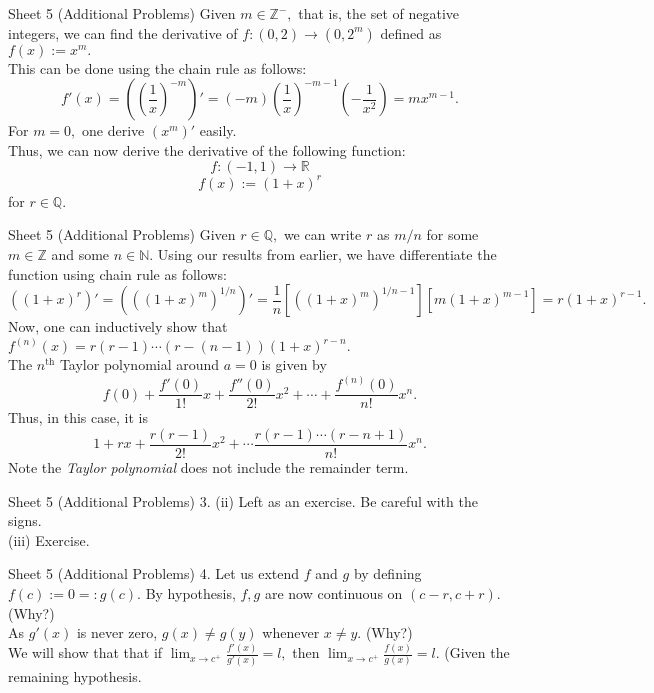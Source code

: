 \documentclass[handout, aspectratio=169]{beamer}
\begin{document}
\begin{frame}{Sheet 5 (Additional Problems)}
	Given $m \in \mathbb{Z}^-,$ that is, the set of negative integers, we can find the derivative of $f:(0, 2) \to (0, 2^m)$ defined as $f(x) := x^m.$\\
	This can be done using the chain rule as follows:
	\[f'(x) = \left(\left(\frac{1}{x}\right)^{-m}\right)' = (-m)\left(\frac{1}{x}\right)^{-m-1}\left(-\dfrac{1}{x^2}\right) = mx^{m-1}.\]
	For $m = 0,$ one derive $(x^m)'$ easily.\\
	Thus, we can now derive the derivative of the following function:
	\[f:(-1, 1) \to \mathbb{R}\] \[f(x) := (1 + x)^r\]
	for $r \in \mathbb{Q}.$
\end{frame}
\begin{frame}{Sheet 5 (Additional Problems)}
	Given $r \in \mathbb{Q},$ we can write $r$ as $m/n$ for some $m \in \mathbb{Z}$ and some $n \in \mathbb{N}.$ Using our results from earlier, we have differentiate the function using chain rule as follows:
	\[\left((1 + x)^r\right)' = \left(\left((1+x)^m\right)^{1/n}\right)' = \frac{1}{n}\left[((1+x)^m)^{1/n - 1}\right]\left[m(1 + x)^{m-1}\right] = r(1 + x)^{r-1}.\]
	Now, one can inductively show that $f^{(n)}(x) =r (r-1)\cdots (r - (n-1))(1 + x)^{r-n}.$\\
	The $n^{\text{th}}$ Taylor polynomial around $a = 0$ is given by
	\[f(0) + \dfrac{f'(0)}{1!}x + \dfrac{f''(0)}{2!}x^2 + \cdots + \dfrac{f^{(n)}(0)}{n!}x^n.\]
	Thus, in this case, it is
	\[1 + rx + \dfrac{r(r-1)}{2!}x^2 + \cdots \dfrac{r(r-1)\cdots(r-n+1)}{n!}x^n.\]
	Note the \emph{Taylor polynomial} does not include the remainder term.
\end{frame}
\begin{frame}{Sheet 5 (Additional Problems)}
	3. (ii) Left as an exercise. Be careful with the signs.\\
	(iii) Exercise.
\end{frame}
\begin{frame}{Sheet 5 (Additional Problems)}
	4. Let us extend $f$ and $g$ by defining $f(c) := 0 =: g(c).$ By hypothesis, $f, g$ are now continuous on $(c-r, c+r).$ (Why?)\\
	As $g'(x)$ is never zero, $g(x) \neq g(y)$ whenever $x \neq y.$ (Why?)\\
	We will show that that if $\displaystyle\lim_{x\to c^+}\frac{f'(x)}{g'(x)} = l,$ then $\displaystyle\lim_{x\to c^+}\frac{f(x)}{g(x)} = l.$ \hfill (Given the remaining hypothesis.
\end{frame}
\end{document}
